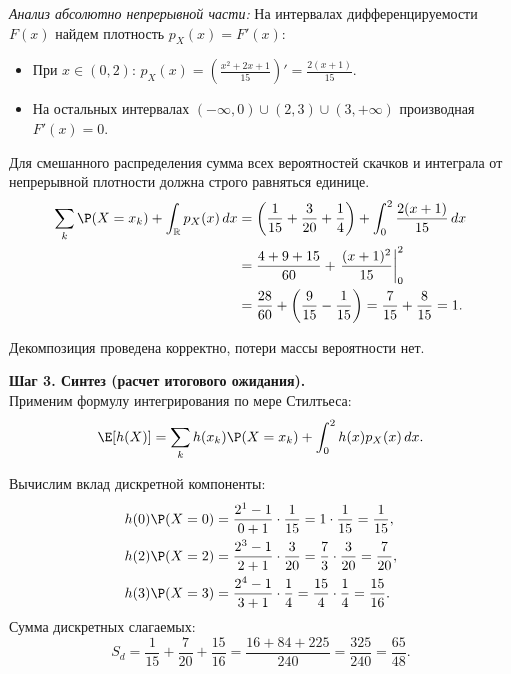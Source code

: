\begin{Solution}
\textit{Анализ абсолютно непрерывной части:}
На интервалах дифференцируемости $F(x)$ найдем плотность $p_X(x) = F'(x)$:
\begin{itemize}
    \item При $x \in (0, 2)$: $p_X(x) = \left( \frac{x^2+2x+1}{15} \right)' = \frac{2(x+1)}{15}$.
    \item На остальных интервалах $(-\infty, 0) \cup (2, 3) \cup (3, +\infty)$ производная $F'(x) = 0$.
\end{itemize}

\begin{WarningBox}
Для смешанного распределения сумма всех вероятностей скачков и интеграла от непрерывной плотности должна строго равняться единице.
\vspace{-0.5em}
\begin{align*}
    \sum_{k} \P(X=x_k) + \int_{\mathbb{R}} p_X(x) \, dx &= \left( \frac{1}{15} + \frac{3}{20} + \frac{1}{4} \right) + \int_{0}^{2} \frac{2(x+1)}{15} \, dx \\
    &= \frac{4 + 9 + 15}{60} + \left. \frac{(x+1)^2}{15} \right|_{0}^{2} \\
    &= \frac{28}{60} + \left( \frac{9}{15} - \frac{1}{15} \right) = \frac{7}{15} + \frac{8}{15} = 1.
\end{align*}
\vspace{-1em}

Декомпозиция проведена корректно, потери массы вероятности нет.
\end{WarningBox}

\textbf{Шаг 3. Синтез (расчет итогового ожидания).} \\
Применим формулу интегрирования по мере Стилтьеса:
\[
\E[h(X)] = \sum_{k} h(x_k)\P(X=x_k) + \int_{0}^{2} h(x)p_X(x) \, dx.
\]

Вычислим вклад дискретной компоненты:
\begin{align*}
    h(0)\P(X=0) &= \frac{2^1 - 1}{0+1} \cdot \frac{1}{15} = 1 \cdot \frac{1}{15} = \frac{1}{15}, \\
    h(2)\P(X=2) &= \frac{2^3 - 1}{2+1} \cdot \frac{3}{20} = \frac{7}{3} \cdot \frac{3}{20} = \frac{7}{20}, \\
    h(3)\P(X=3) &= \frac{2^4 - 1}{3+1} \cdot \frac{1}{4} = \frac{15}{4} \cdot \frac{1}{4} = \frac{15}{16}.
\end{align*}
Сумма дискретных слагаемых:
\[
S_d = \frac{1}{15} + \frac{7}{20} + \frac{15}{16} = \frac{16 + 84 + 225}{240} = \frac{325}{240} = \frac{65}{48}.
\]


\end{Solution}
